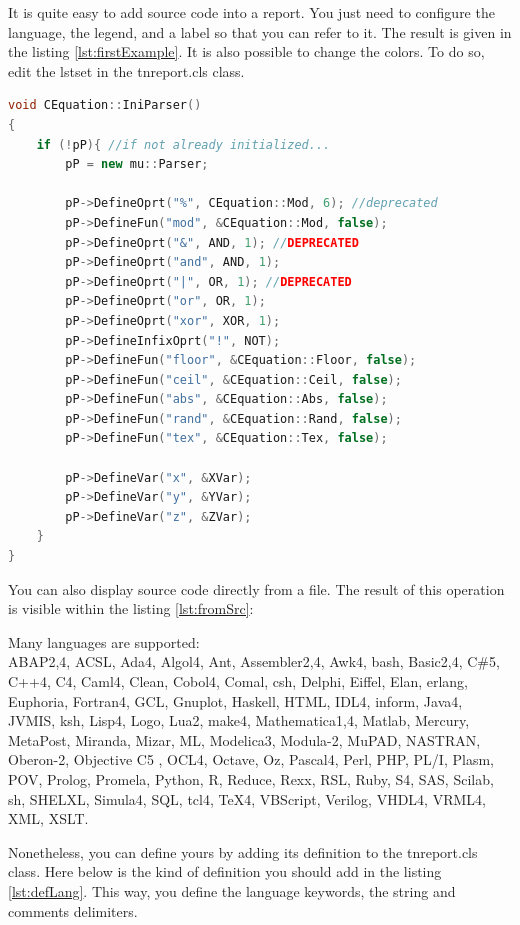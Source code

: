 \documentclass{tnreport}
\begin{document}
It is quite easy to add source code into a report. You just need to configure the language, the legend, and a label so that you can refer to it. The result is given in the listing \ref{lst:firstExample}. It is also possible to change the colors. To do so, edit the lstset in the tnreport.cls class.

\begin{lstlisting}[language=c++, caption={First Example}, label={lst:firstExample}]
void CEquation::IniParser()
{
	if (!pP){ //if not already initialized...
		pP = new mu::Parser;

		pP->DefineOprt("%", CEquation::Mod, 6); //deprecated
		pP->DefineFun("mod", &CEquation::Mod, false);
		pP->DefineOprt("&", AND, 1); //DEPRECATED
		pP->DefineOprt("and", AND, 1);
		pP->DefineOprt("|", OR, 1); //DEPRECATED
		pP->DefineOprt("or", OR, 1);
		pP->DefineOprt("xor", XOR, 1);
		pP->DefineInfixOprt("!", NOT);
		pP->DefineFun("floor", &CEquation::Floor, false);
		pP->DefineFun("ceil", &CEquation::Ceil, false);
		pP->DefineFun("abs", &CEquation::Abs, false);
		pP->DefineFun("rand", &CEquation::Rand, false);
		pP->DefineFun("tex", &CEquation::Tex, false);
	
		pP->DefineVar("x", &XVar);
		pP->DefineVar("y", &YVar);
		pP->DefineVar("z", &ZVar);
	}
}
\end{lstlisting}

\clearpage

You can also display source code directly from a file. The result of this operation is visible within the listing \ref{lst:fromSrc}:



Many languages are supported: \\
ABAP2,4, ACSL, Ada4, Algol4, Ant, Assembler2,4, Awk4, bash, Basic2,4, C\#5, C++4, C4, Caml4, Clean, Cobol4, Comal, csh, Delphi, Eiffel, Elan, erlang, Euphoria, Fortran4, GCL, Gnuplot, Haskell, HTML, IDL4, inform, Java4, JVMIS, ksh, Lisp4, Logo, Lua2, make4, Mathematica1,4, Matlab, Mercury, MetaPost, Miranda, Mizar, ML, Modelica3, Modula-2, MuPAD, NASTRAN, Oberon-2, Objective C5 , OCL4, Octave, Oz, Pascal4, Perl, PHP, PL/I, Plasm, POV, Prolog, Promela, Python, R, Reduce, Rexx, RSL, Ruby, S4, SAS, Scilab, sh, SHELXL, Simula4, SQL, tcl4, TeX4, VBScript, Verilog, VHDL4, VRML4, XML, XSLT.

\clearpage

Nonetheless, you can define yours by adding its definition to the tnreport.cls class. Here below is the kind of definition you should add in the listing \ref{lst:defLang}. This way, you define the language keywords, the string and comments delimiters.
\end{document}

